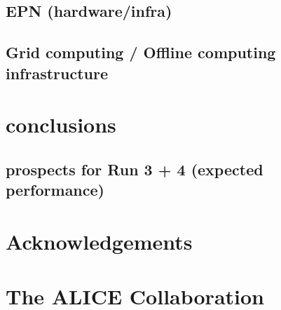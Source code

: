 \documentclass[ALICE,manyauthors]{cernphprep}
\begin{document}
\subsection{EPN (hardware/infra)}
\subsection{Grid computing / Offline computing infrastructure}

\section{conclusions}
\subsection{prospects for Run 3 + 4 (expected performance)}

\cleardoublepage
\newenvironment{acknowledgement}{\relax}{\relax}
\begin{acknowledgement}
\section*{Acknowledgements}
%
\end{acknowledgement}



\newpage
\appendix

%
%

\section{The ALICE Collaboration}
\label{app:collab}
%
\end{document}
